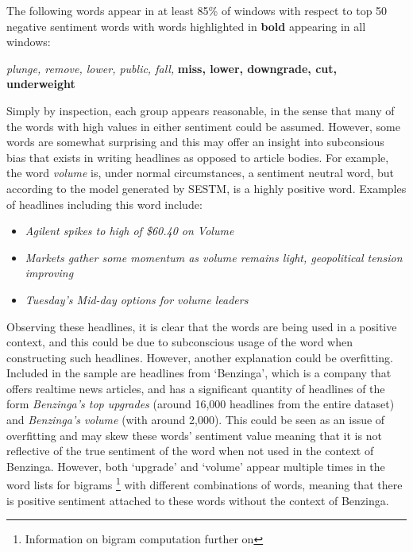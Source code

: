 \noindent
The following words appear in at least 85\% of windows with respect to top 50 negative sentiment words with words highlighted in \textbf{bold} appearing in all windows:
\begin{center}
      \textit{plunge, remove, lower, public, fall,} \textbf{miss, lower, downgrade, cut, underweight}
\end{center}

Simply by inspection, each group appears reasonable, in the sense that many of the words with high values in either sentiment could be assumed. However, some words are somewhat surprising and this may offer an insight into subconsious bias that exists in writing headlines as opposed to article bodies. For example, the word \textit{volume} is, under normal circumstances, a sentiment neutral word, but according to the model generated by SESTM, is a highly positive word. Examples of headlines including this word include:
\begin{itemize}
      \item \textit{Agilent spikes to high of \$60.40 on Volume}
      \item \textit{Markets gather some momentum as volume remains light, geopolitical tension improving}
      \item \textit{Tuesday's Mid-day options for volume leaders}
\end{itemize}

Observing these headlines, it is clear that the words are being used in a positive context, and this could be due to subconscious usage of the word when constructing such headlines. However, another explanation could be overfitting. Included in the sample are headlines from `Benzinga', which is a company that offers realtime news articles, and has a significant quantity of headlines of the form \textit{Benzinga's top upgrades} (around 16,000 headlines from the entire dataset) and \textit{Benzinga's volume} (with around 2,000). This could be seen as an issue of overfitting and may skew these words' sentiment value meaning that it is not reflective of the true sentiment of the word when not used in the context of Benzinga. However, both `upgrade' and `volume' appear multiple times in the word lists for bigrams \footnote{Information on bigram computation further on} with different combinations of words, meaning that there is positive sentiment attached to these words without the context of Benzinga.

